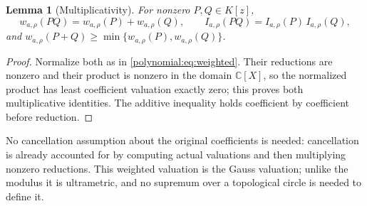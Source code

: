 \documentclass[11pt,letterpaper]{article}
\numberwithin{equation}{section}
\newtheorem{lemma}[theorem]{Lemma}
\theoremstyle{definition}
\theoremstyle{remark}\newtheorem{remark}[theorem]{Remark}
\newcommand{\C}{\mathbb C}
\begin{document}
\begin{lemma}[Multiplicativity]\label{polynomial:lem:gaussvaluation}
For nonzero $P,Q\in K[z]$,
\[
 w_{a,\rho}(PQ)=w_{a,\rho}(P)+w_{a,\rho}(Q),\qquad
 I_{a,\rho}(PQ)=I_{a,\rho}(P)\,I_{a,\rho}(Q),
\]
and $w_{a,\rho}(P+Q)\ge\min\{w_{a,\rho}(P),w_{a,\rho}(Q)\}$.
\end{lemma}
\begin{proof}
Normalize both as in \eqref{polynomial:eq:weighted}. Their reductions are
nonzero and their product is nonzero in the domain $\C[X]$, so the normalized
product has least coefficient valuation exactly zero; this proves both
multiplicative identities. The additive inequality holds coefficient by
coefficient before reduction.
\end{proof}

No cancellation assumption about the original coefficients is needed:
cancellation is already accounted for by computing actual valuations and then
multiplying nonzero reductions. This weighted valuation is the Gauss
valuation; unlike the modulus it is ultrametric, and no supremum over a
topological circle is needed to define it.
\end{document}

